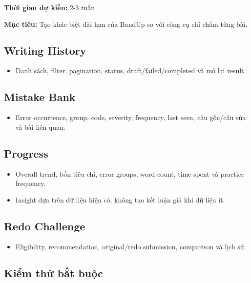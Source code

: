 \documentclass[
  11pt,
  a4paper,
]{article}
\begin{document}
\textbf{Thời gian dự kiến:} 2-3 tuần

\textbf{Mục tiêu:} Tạo khác biệt dài hạn của BandUp so với công cụ chỉ
chấm từng bài.

\subsection{Writing History}\label{writing-history}

\begin{itemize}
\item
  Danh sách, filter, pagination, status, draft/failed/completed và mở
  lại result.
\end{itemize}

\subsection{Mistake Bank}\label{mistake-bank}

\begin{itemize}
\item
  Error occurrence, group, code, severity, frequency, last seen, câu
  gốc/câu sửa và bài liên quan.
\end{itemize}

\subsection{Progress}\label{progress}

\begin{itemize}
\item
  Overall trend, bốn tiêu chí, error groups, word count, time spent và
  practice frequency.
\item
  Insight dựa trên dữ liệu hiện có; không tạo kết luận giả khi dữ liệu
  ít.
\end{itemize}

\subsection{Redo Challenge}\label{redo-challenge}

\begin{itemize}
\item
  Eligibility, recommendation, original/redo submission, comparison và
  lịch sử.
\end{itemize}

\subsection{Kiểm thử bắt
buộc}\label{kiux1ec3m-thux1eed-bux1eaft-buux1ed9c-6}
\end{document}
